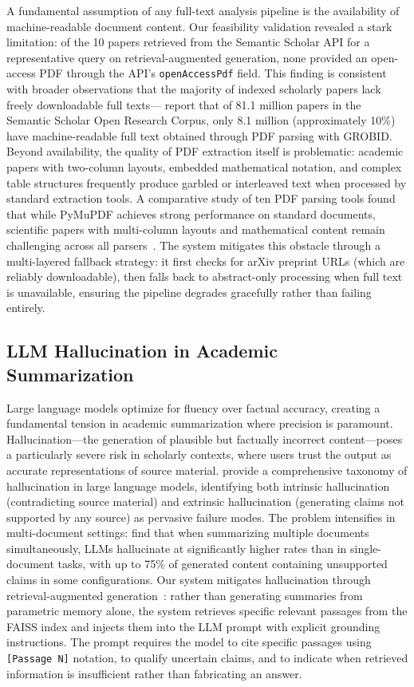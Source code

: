 \documentclass[12pt,a4paper]{article}
\begin{document}
A fundamental assumption of any full-text analysis pipeline is the availability of machine-readable document content. Our feasibility validation revealed a stark limitation: of the 10 papers retrieved from the Semantic Scholar API for a representative query on retrieval-augmented generation, none provided an open-access PDF through the API's \texttt{openAccessPdf} field. This finding is consistent with broader observations that the majority of indexed scholarly papers lack freely downloadable full texts---\citet{lo2020s2orc} report that of 81.1 million papers in the Semantic Scholar Open Research Corpus, only 8.1 million (approximately 10\%) have machine-readable full text obtained through PDF parsing with GROBID. Beyond availability, the quality of PDF extraction itself is problematic: academic papers with two-column layouts, embedded mathematical notation, and complex table structures frequently produce garbled or interleaved text when processed by standard extraction tools. A comparative study of ten PDF parsing tools found that while PyMuPDF achieves strong performance on standard documents, scientific papers with multi-column layouts and mathematical content remain challenging across all parsers~\citep{adhikari2024pdfparsing}. The system mitigates this obstacle through a multi-layered fallback strategy: it first checks for arXiv preprint URLs (which are reliably downloadable), then falls back to abstract-only processing when full text is unavailable, ensuring the pipeline degrades gracefully rather than failing entirely.

\subsection{LLM Hallucination in Academic Summarization}

Large language models optimize for fluency over factual accuracy, creating a fundamental tension in academic summarization where precision is paramount. Hallucination---the generation of plausible but factually incorrect content---poses a particularly severe risk in scholarly contexts, where users trust the output as accurate representations of source material. \citet{huang2024hallucination} provide a comprehensive taxonomy of hallucination in large language models, identifying both intrinsic hallucination (contradicting source material) and extrinsic hallucination (generating claims not supported by any source) as pervasive failure modes. The problem intensifies in multi-document settings: \citet{belem2025hallucination} find that when summarizing multiple documents simultaneously, LLMs hallucinate at significantly higher rates than in single-document tasks, with up to 75\% of generated content containing unsupported claims in some configurations. Our system mitigates hallucination through retrieval-augmented generation~\citep{lewis2020rag}: rather than generating summaries from parametric memory alone, the system retrieves specific relevant passages from the FAISS index and injects them into the LLM prompt with explicit grounding instructions. The prompt requires the model to cite specific passages using \texttt{[Passage N]} notation, to qualify uncertain claims, and to indicate when retrieved information is insufficient rather than fabricating an answer.
\end{document}
